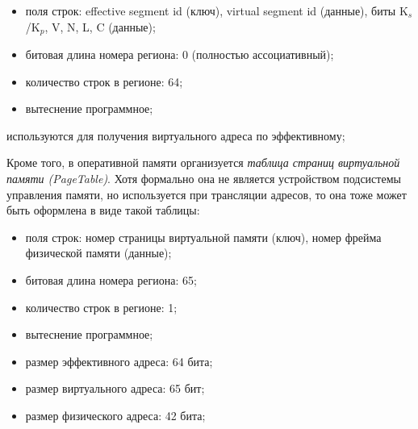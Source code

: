 \begin{itemize}
        \begin{itemize}
            \item поля строк: effective segment id (ключ), virtual segment id
(данные), биты K$_s$/K$_p$, V, N, L, C (данные);
            \item битовая длина номера региона: 0 (полностью ассоциативный);
            \item количество строк в регионе: 64;
            \item вытеснение программное;
        \end{itemize}
        используются для получения виртуального адреса по эффективному;
\end{itemize}

Кроме того, в оперативной памяти организуется \emph{таблица страниц виртуальной памяти (PageTable)}. Хотя формально она не является устройством подсистемы управления памяти, но используется при трансляции адресов, то она тоже может быть оформлена в виде такой таблицы:
    \begin{itemize}
        \item поля строк: номер страницы виртуальной памяти (ключ), номер фрейма
физической памяти (данные);
        \item битовая длина номера региона: 65;
        \item количество строк в регионе: 1;
        \item вытеснение программное;
        \item размер эффективного адреса: 64 бита;
        \item размер виртуального адреса: 65 бит;
        \item размер физического адреса: 42 бита;
    \end{itemize}

